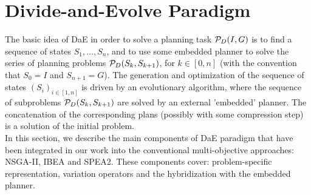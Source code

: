 \documentclass{llncs}
\begin{document}
\section{Divide-and-Evolve Paradigm}
\label{sec:dae}
The basic idea of DaE in order to solve a planning task ${\cal P}_D(I,G)$ is to find a sequence of states $S_1, \ldots, S_n$, and to use some embedded planner to solve the series of planning problems ${\cal P}_D(S_{k},S_{k+1})$, for $k \in [0,n]$ 
(with the convention that $S_0 = I$ and $S_{n+1} = G$).
The generation and optimization of the sequence of states $(S_i)_{i \in [1,n]}$  is driven by an evolutionary algorithm, where the   sequence of subproblems ${\cal P}_D(S_{k},S_{k+1})$ are solved by an external 'embedded'
planner. The concatenation of the corresponding plans  (possibly with some compression step) is a solution of the initial problem.\\
\indent In this section, we  describe the main components of DaE paradigm that have been integrated in our work into the conventional multi-objective approaches: NSGA-II, IBEA and SPEA2.   
These  components cover: problem-specific representation, variation operators and  the hybridization with the embedded planner.
\end{document}
